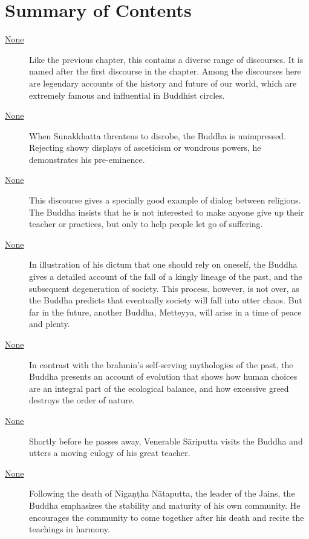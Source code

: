 \documentclass[12pt,openany]{book}%
\begin{document}
\newpage

\setlength{\parindent}{1.5em}%
\tableofcontents
\newpage
\pagestyle{fancy}
%
\chapter*{Summary of Contents}

\begin{description}%
\item[\href{\#dn{-}pathikavagga}{None}] Like the previous chapter, this contains a diverse range of discourses. It is named after the first discourse in the chapter. Among the discourses here are legendary accounts of the history and future of our world, which are extremely famous and influential in Buddhist circles.%
\item[\href{\#dn24}{None}] When Sunakkhatta threatens to disrobe, the Buddha is unimpressed. Rejecting showy displays of asceticism or wondrous powers, he demonstrates his pre-eminence.%
\item[\href{\#dn25}{None}] This discourse gives a specially good example of dialog between religions. The Buddha insists that he is not interested to make anyone give up their teacher or practices, but only to help people let go of suffering.%
\item[\href{\#dn26}{None}] In illustration of his dictum that one should rely on oneself, the Buddha gives a detailed account of the fall of a kingly lineage of the past, and the subsequent degeneration of society. This process, however, is not over, as the Buddha predicts that eventually society will fall into utter chaos. But far in the future, another Buddha, Metteyya, will arise in a time of peace and plenty.%
\item[\href{\#dn27}{None}] In contrast with the brahmin’s self-serving mythologies of the past, the Buddha presents an account of evolution that shows how human choices are an integral part of the ecological balance, and how excessive greed destroys the order of nature.%
\item[\href{\#dn28}{None}] Shortly before he passes away, Venerable \textsanskrit{Sāriputta} visits the Buddha and utters a moving eulogy of his great teacher.%
\item[\href{\#dn29}{None}] Following the death of \textsanskrit{Nigaṇṭha} \textsanskrit{Nātaputta}, the leader of the Jains, the Buddha emphasizes the stability and maturity of his own community. He encourages the community to come together after his death and recite the teachings in harmony.%

\end{description}
\end{document}
